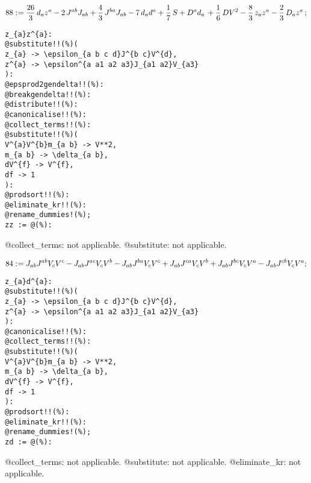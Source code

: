 \documentclass[11pt]{article}
\def\specialcolon{\mathrel{\mathop{:}}\hspace{-.5em}}
\begin{document}
\begin{dmath*}[compact, spread=2pt]
88\specialcolon{}= \frac{26}{3}\, {d}_{a} {z}^{a} - 2\, {J}^{a b} {J}_{a b} + \frac{4}{3}\, {J}^{b a} {J}_{a b} - 7\, {d}_{a} {d}^{a} + \frac{1}{7}\, S + {D}^{a}{{d}_{a}}\,  + \frac{1}{6}\, DV{}^{2} - \frac{8}{3}\, {z}_{a} {z}^{a} - \frac{2}{3}\, {D}_{a}{{z}^{a}}\, ;
\end{dmath*}
{\color[named]{Blue}\begin{verbatim}
z_{a}z^{a}:
@substitute!!(%)(
z_{a} -> \epsilon_{a b c d}J^{b c}V^{d},
z^{a} -> \epsilon^{a a1 a2 a3}J_{a1 a2}V_{a3}
):
@epsprod2gendelta!!(%):
@breakgendelta!!(%):
@distribute!!(%):
@canonicalise!!(%):
@collect_terms!!(%):
@substitute!!(%)(
V^{a}V^{b}m_{a b} -> V**2,
m_{a b} -> \delta_{a b},
dV^{f} -> V^{f},
df -> 1
):
@prodsort!!(%):
@eliminate_kr!!(%):
@rename_dummies!(%);
zz := @(%):
\end{verbatim}}
@collect\_terms: not applicable.
@substitute: not applicable.








\begin{dmath*}[compact, spread=2pt]
84\specialcolon{}= {J}_{a b} {J}^{a b} {V}_{c} {V}^{c} - {J}_{a b} {J}^{a c} {V}_{c} {V}^{b} - {J}_{a b} {J}^{b a} {V}_{c} {V}^{c} + {J}_{a b} {J}^{c a} {V}_{c} {V}^{b} + {J}_{a b} {J}^{b c} {V}_{c} {V}^{a} - {J}_{a b} {J}^{c b} {V}_{c} {V}^{a};
\end{dmath*}
{\color[named]{Blue}\begin{verbatim}
z_{a}d^{a}:
@substitute!!(%)(
z_{a} -> \epsilon_{a b c d}J^{b c}V^{d},
z^{a} -> \epsilon^{a a1 a2 a3}J_{a1 a2}V_{a3}
):
@canonicalise!!(%):
@collect_terms!!(%):
@substitute!!(%)(
V^{a}V^{b}m_{a b} -> V**2,
m_{a b} -> \delta_{a b},
dV^{f} -> V^{f},
df -> 1
):
@prodsort!!(%):
@eliminate_kr!!(%):
@rename_dummies!(%);
zd := @(%):
\end{verbatim}}
@collect\_terms: not applicable.
@substitute: not applicable.
@eliminate\_kr: not applicable.
\end{document}
